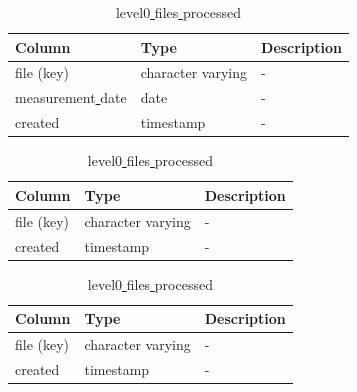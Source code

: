 \documentclass[12pt]{article}
\begin{document}
\begin{table}[!htb]
 \begin{scriptsize}
  \centering
    \captionsetup{font=scriptsize}
    \caption{Tables used for the processing}
    \label{table:processfile}
    \begin{subtable}{.9\linewidth}
     \captionsetup{font=scriptsize}
      \centering
      \caption{level0\underline{ }files}
      \label{table:level0f}
        \begin{tabular}{l l l}
         \hline\hline
Column & Type & Description \\ [0.5ex]
\hline
file (key)                     & character varying                   & -\\
measurement\underline{ }date   & date                        & -\\
created                        & timestamp                   & -\\[1ex]
\hline   
        \end{tabular}
    \end{subtable}%
    \newline
    \newline

    \begin{subtable}{.9\linewidth}
     \captionsetup{font=scriptsize}
      \centering
      \caption{level0\underline{ }files\underline{ }in\underline{ }process}
      \label{table:level0fip}
        \begin{tabular}{l l l}
\hline\hline
Column & Type & Description \\ [0.5ex]
\hline
file (key)                     & character varying                  & -\\
created                        & timestamp                   & -\\[1ex]
\hline            
        \end{tabular}
    \end{subtable}%
    \newline
    \newline

    \begin{subtable}{.9\linewidth}
     \captionsetup{font=scriptsize}
      \centering
         \caption{level0\underline{ }files\underline{ }processed}
      \label{table:level0fp}
        \begin{tabular}{l l l}
\hline\hline
Column & Type & Description \\ [0.5ex]
\hline
file (key)                     & character varying                  & -\\
created                        & timestamp                   & -\\[1ex]
\hline
            

\end{tabular}
\end{subtable}
\end{scriptsize}
\end{table}
\end{document}
